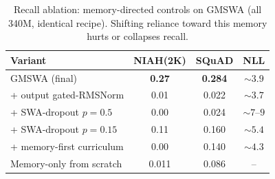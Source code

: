 \documentclass[letterpaper]{article} %
\begin{document}
\begin{table}[t]\centering\small
\caption{Recall ablation: memory-directed controls on GMSWA (all 340M, identical recipe). Shifting reliance toward this memory hurts or collapses recall.}
\label{tab:ablation}
\begin{tabular}{lccc}
\toprule
Variant & NIAH(2K) & SQuAD & NLL \\
\midrule
GMSWA (final) & \textbf{0.27} & \textbf{0.284} & ${\sim}3.9$ \\
\;+ output gated-RMSNorm & 0.01 & 0.022 & ${\sim}3.7$ \\
\;+ SWA-dropout $p{=}0.5$ & 0.00 & 0.024 & ${\sim}7$--$9$ \\
\;+ SWA-dropout $p{=}0.15$ & 0.11 & 0.160 & ${\sim}5.4$ \\
\;+ memory-first curriculum & 0.00 & 0.140 & ${\sim}4.3$ \\
Memory-only from scratch & 0.011 & 0.086 & -- \\
\bottomrule
\end{tabular}
\end{table}


\end{document}
